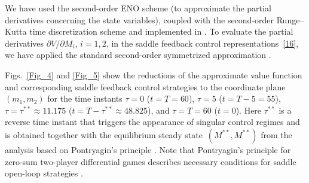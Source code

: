 \documentclass[11pt]{amsart}
\begin{document}
We have used the second-order ENO scheme (to approximate the partial
derivatives concerning the state variables), coupled with the second-order
Runge--Kutta time discretization scheme and implemented in \cite{ROCHJ2019}.
To evaluate the partial derivatives $ \partial V / \partial M_i $, $ i = 1,2 $,
in the saddle feedback control representations~\cref{16}, we have applied the
standard second-order symmetrized approximation
\cite[\S 5.7]{PressTeukolskyVetterlingFlannery2007}.

Figs.~\ref{Fig_4} and \ref{Fig_5} show the reductions of the approximate
value function and corresponding saddle feedback control strategies to the
coordinate plane $ (m_1, m_2) $ for the time instants 
$ \tau = 0 $ ($ t = T = 60 $), $ \tau = 5 $ ($ t = T - 5 = 55 $),
$ \tau = \tau^{**} \approx 11.175 $ ($ t = T - \tau^{**} \approx 48.825 $),
and $ \tau = T = 60 $ ($ t = 0 $). Here $ \tau^{**} $ is a reverse time instant
that triggers the appearance of singular control regimes and is obtained
together with the equilibrium steady state~$ \left( M^{**}, M^{**} \right) $
from the analysis based on Pontryagin's principle 
\cite{YegorovGrognardMailleretHalkettBernhard2019}. Note that Pontryagin's
principle for zero-sum two-player differential games describes necessary
conditions for saddle open-loop strategies \cite{Yong2015}.
\end{document}
